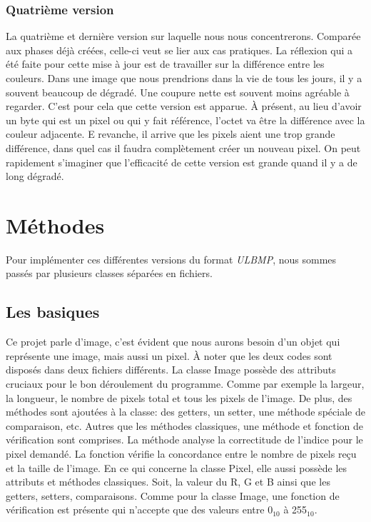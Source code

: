 \documentclass[utf8]{article}
\begin{document}
\subsubsection{Quatrième version}
La quatrième et dernière version sur laquelle nous nous concentrerons. Comparée aux phases déjà créées, celle-ci veut se lier aux cas pratiques. La réflexion qui a été faite pour cette mise à jour est de travailler sur la différence entre les couleurs. Dans une image que nous prendrions dans la vie de tous les jours, il y a souvent beaucoup de dégradé. Une coupure nette est souvent moins agréable à regarder. C’est pour cela que cette version est apparue. À présent, au lieu d’avoir un byte qui est un pixel ou qui y fait référence, l’octet va être la différence avec la couleur adjacente. E revanche, il arrive que les pixels aient une trop grande différence, dans quel cas il faudra complètement créer un nouveau pixel. On peut rapidement s’imaginer que l’efficacité de cette version est grande quand il y a de long dégradé.

\section{Méthodes}
Pour implémenter ces différentes versions du format \textit{ULBMP}, nous sommes passés par plusieurs classes séparées en fichiers.

\subsection{Les basiques}
Ce projet parle d’image, c’est évident que nous aurons besoin d’un objet qui représente une image, mais aussi un pixel. À noter que les deux codes sont disposés dans deux fichiers différents. La classe Image possède des attributs cruciaux pour le bon déroulement du programme. Comme par exemple la largeur, la longueur, le nombre de pixels total et tous les pixels de l’image. De plus, des méthodes sont ajoutées à la classe: des getters, un setter, une méthode spéciale de comparaison, etc. Autres que les méthodes classiques, une méthode et fonction de vérification sont comprises. La méthode analyse la correctitude de l’indice pour le pixel demandé. La fonction vérifie la concordance entre le nombre de pixels reçu et la taille de l’image. En ce qui concerne la classe Pixel, elle aussi possède les attributs et méthodes classiques. Soit, la valeur du R, G et B ainsi que les getters, setters, comparaisons. Comme pour la classe Image, une fonction de vérification est présente qui n’accepte que des valeurs entre 0$_{10}$ à 255$_{10}$.
\end{document}
